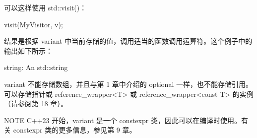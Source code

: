 可以这样使用 std::visit()：

\begin{cpp}
visit(MyVisitor{}, v);
\end{cpp}

结果是根据 variant 中当前存储的值，调用适当的函数调用运算符。这个例子中的输出如下所示：

\begin{shell}
string: An std::string
\end{shell}

variant 不能存储数组，并且与第 1 章中介绍的 optional 一样，也不能存储引用。可以存储指针或 reference\_wrapper<T> 或 reference\_wrapper<const T> 的实例（请参阅第 18 章）。

\begin{myNotic}{NOTE}
C++23 开始，variant 是一个 constexpr 类，因此可以在编译时使用。有关 constexpr 类的更多信息，参见第 9 章。
\end{myNotic}





